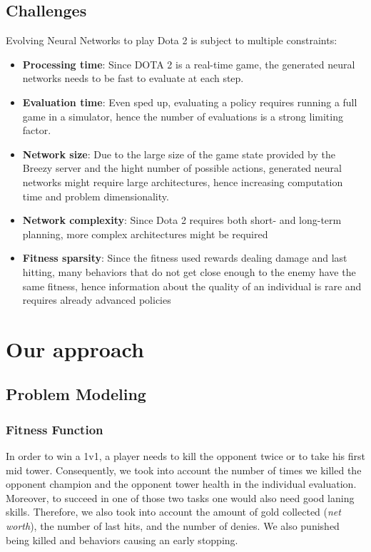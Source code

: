 \subsection{Challenges}
Evolving Neural Networks to play Dota 2 is subject to multiple constraints:
\begin{itemize}
    \item \textbf{Processing time}: Since DOTA 2 is a real-time game, the generated neural networks needs to be fast to evaluate at each step.
    \item \textbf{Evaluation time}: Even sped up, evaluating a policy requires running a full game in a simulator, hence the number of evaluations is a strong limiting factor.
    \item \textbf{Network size}: Due to the large size of the game state provided by the Breezy server and the hight number of possible actions, generated neural networks might require large architectures, hence increasing computation time and problem dimensionality.
    \item\textbf{Network complexity}: Since Dota 2 requires both short- and long-term planning, more complex architectures might be required 
    \item \textbf{Fitness sparsity}: Since the fitness used rewards dealing damage and last hitting, many behaviors that do not get close enough to the enemy have the same fitness, hence information about the quality of an individual is rare and requires already advanced policies
\end{itemize}

\section{Our approach}

\subsection{Problem Modeling}
\label{sec:representation choice}

\subsubsection{Fitness Function}
In order to win a 1v1, a player needs to kill the opponent twice or to take his first mid tower. Consequently, we took into account the number of times we killed the opponent champion and the opponent tower health in the individual evaluation. Moreover, to succeed in one of those two tasks one would also need good laning skills. Therefore, we also took into account the amount of gold collected (\textit{net worth}), the number of last hits, and the number of denies. We also punished being killed and behaviors causing an early stopping.

